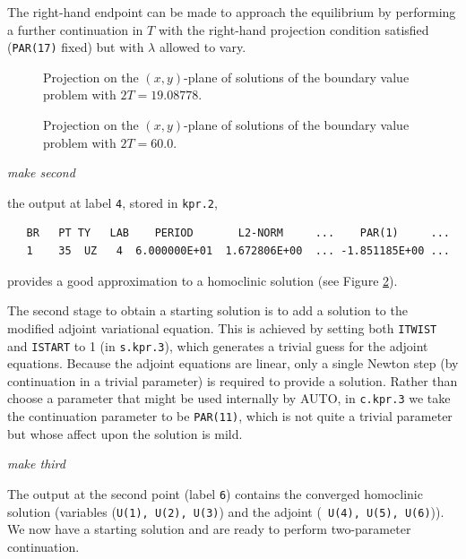 \documentclass[12pt]{report}
\begin{document}
The right-hand endpoint can be made to approach the
equilibrium by performing a further continuation in $T$ with the
right-hand projection condition satisfied ({\tt PAR(17)} fixed) but
with $\lambda$ allowed to vary. 
%
\begin{figure}[p]
\epsfysize 9.0cm
\centerline{}
\caption{Projection on the $(x,y)$-plane of solutions 
of the boundary value 
problem with $2T=19.08778$.}
\label{kf.1a}
\end{figure}
\begin{figure}[p]
\epsfysize 9.0cm
\centerline{}
\caption{Projection on the $(x,y)$-plane of solutions of the 
boundary value problem with $2T = 60.0$.}
\label{kf.1b}
\end{figure}
%
\begin{center}
{\it make second}
\end{center}
the output at label {\tt 4}, stored in {\tt kpr.2},
\begin{verbatim}
   BR   PT TY   LAB    PERIOD       L2-NORM     ...    PAR(1)     ...
   1    35  UZ   4  6.000000E+01  1.672806E+00  ... -1.851185E+00 ...
\end{verbatim}
provides a good approximation to a homoclinic solution (see Figure
\ref{kf.1b}). 

The second stage to obtain a starting solution 
is to add a solution to the modified adjoint
variational equation. This is achieved by setting both 
{\tt ITWIST} and {\tt ISTART} to 1 (in {\tt s.kpr.3}), which generates
a trivial guess for the adjoint equations. Because the adjoint
equations are linear, only a single
Newton step (by continuation in a trivial parameter) 
is required to provide a solution.
Rather than choose a parameter that might be used internally
by {\cal AUTO}, in {\tt c.kpr.3} we take the continuation parameter
to be {\tt PAR(11)}, which is not quite a trivial parameter
but whose affect upon the solution is mild.
\begin{center}
{\it make third}
\end{center}
The output at the second point (label {\tt 6}) 
contains the converged homoclinic
solution (variables ({\tt U(1), U(2), U(3)}) and the adjoint ({\tt
U(4), U(5), U(6)})). We now have a starting solution 
and are ready to perform two-parameter continuation.
\end{document}
